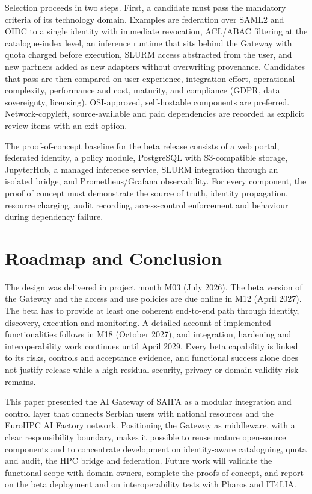 \documentclass[conference,a4paper]{IEEEtran}
\begin{document}
Selection proceeds in two steps. First, a candidate must pass the mandatory criteria of its technology domain. Examples are federation over SAML2 and OIDC to a single identity with immediate revocation, ACL/ABAC filtering at the catalogue-index level, an inference runtime that sits behind the Gateway with quota charged before execution, SLURM access abstracted from the user, and new partners added as new adapters without overwriting provenance. Candidates that pass are then compared on user experience, integration effort, operational complexity, performance and cost, maturity, and compliance (GDPR, data sovereignty, licensing). OSI-approved, self-hostable components are preferred. Network-copyleft, source-available and paid dependencies are recorded as explicit review items with an exit option.

The proof-of-concept baseline for the beta release consists of a web portal, federated identity, a policy module, PostgreSQL with S3-compatible storage, JupyterHub, a managed inference service, SLURM integration through an isolated bridge, and Prometheus/Grafana observability. For every component, the proof of concept must demonstrate the source of truth, identity propagation, resource charging, audit recording, access-control enforcement and behaviour during dependency failure.

\section{Roadmap and Conclusion}

The design was delivered in project month M03 (July 2026). The beta version of the Gateway and the access and use policies are due online in M12 (April 2027). The beta has to provide at least one coherent end-to-end path through identity, discovery, execution and monitoring. A detailed account of implemented functionalities follows in M18 (October 2027), and integration, hardening and interoperability work continues until April 2029. Every beta capability is linked to its risks, controls and acceptance evidence, and functional success alone does not justify release while a high residual security, privacy or domain-validity risk remains.

This paper presented the AI Gateway of SAIFA as a modular integration and control layer that connects Serbian users with national resources and the EuroHPC AI Factory network. Positioning the Gateway as middleware, with a clear responsibility boundary, makes it possible to reuse mature open-source components and to concentrate development on identity-aware cataloguing, quota and audit, the HPC bridge and federation. Future work will validate the functional scope with domain owners, complete the proofs of concept, and report on the beta deployment and on interoperability tests with Pharos and IT4LIA.



\end{document}

